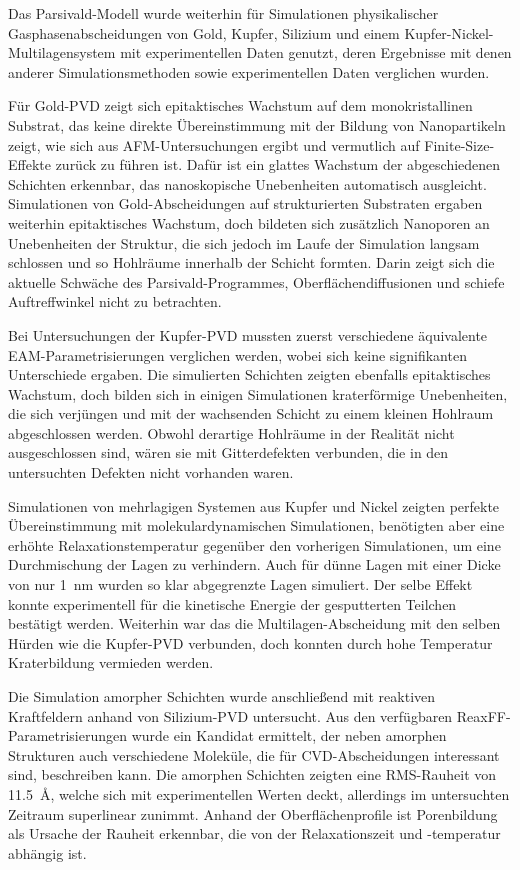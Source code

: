 
Das Parsivald-Modell wurde weiterhin für Simulationen physikalischer Gasphasenabscheidungen von Gold, Kupfer, Silizium und einem Kupfer-Nickel-Multilagensystem mit experimentellen Daten genutzt, deren Ergebnisse mit denen anderer Simulationsmethoden sowie experimentellen Daten verglichen wurden.

Für Gold-PVD zeigt sich epitaktisches Wachstum auf dem monokristallinen Substrat, das keine direkte Übereinstimmung mit der Bildung von Nanopartikeln zeigt, wie sich aus AFM-Untersuchungen ergibt und vermutlich auf Finite-Size-Effekte zurück zu führen ist.
Dafür ist ein glattes Wachstum der abgeschiedenen Schichten erkennbar, das nanoskopische Unebenheiten automatisch ausgleicht.
Simulationen von Gold-Abscheidungen auf strukturierten Substraten ergaben weiterhin epitaktisches Wachstum, doch bildeten sich zusätzlich Nanoporen an Unebenheiten der Struktur, die sich jedoch im Laufe der Simulation langsam schlossen und so Hohlräume innerhalb der Schicht formten.
Darin zeigt sich die aktuelle Schwäche des Parsivald-Programmes, Oberflächendiffusionen und schiefe Auftreffwinkel nicht zu betrachten.

Bei Untersuchungen der Kupfer-PVD mussten zuerst verschiedene äquivalente EAM-Parametrisierungen verglichen werden, wobei sich keine signifikanten Unterschiede ergaben.
Die simulierten Schichten zeigten ebenfalls epitaktisches Wachstum, doch bilden sich in einigen Simulationen kraterförmige Unebenheiten, die sich verjüngen und mit der wachsenden Schicht zu einem kleinen Hohlraum abgeschlossen werden.
Obwohl derartige Hohlräume in der Realität nicht ausgeschlossen sind, wären sie mit Gitterdefekten verbunden, die in den untersuchten Defekten nicht vorhanden waren.

Simulationen von mehrlagigen Systemen aus Kupfer und Nickel zeigten perfekte Übereinstimmung mit molekulardynamischen Simulationen, benötigten aber eine erhöhte Relaxationstemperatur gegenüber den vorherigen Simulationen, um eine Durchmischung der Lagen zu verhindern.
Auch für dünne Lagen mit einer Dicke von nur \SI{1}{\nano\meter} wurden so klar abgegrenzte Lagen simuliert.
Der selbe Effekt konnte experimentell für die kinetische Energie der gesputterten Teilchen bestätigt werden.
Weiterhin war das die Multilagen-Abscheidung mit den selben Hürden wie die Kupfer-PVD verbunden, doch konnten durch hohe Temperatur Kraterbildung vermieden werden.

Die Simulation amorpher Schichten wurde anschließend mit reaktiven Kraftfeldern anhand von Silizium-PVD untersucht.
Aus den verfügbaren ReaxFF-Parametrisierungen wurde ein Kandidat ermittelt, der neben amorphen Strukturen auch verschiedene Moleküle, die für CVD-Abscheidungen interessant sind, beschreiben kann.
Die amorphen Schichten zeigten eine RMS-Rauheit von \SI{11.5}{\angstrom}, welche sich mit experimentellen Werten deckt, allerdings im untersuchten Zeitraum superlinear zunimmt.
Anhand der Oberflächenprofile ist Porenbildung als Ursache der Rauheit erkennbar, die von der Relaxationszeit und -temperatur abhängig ist.


